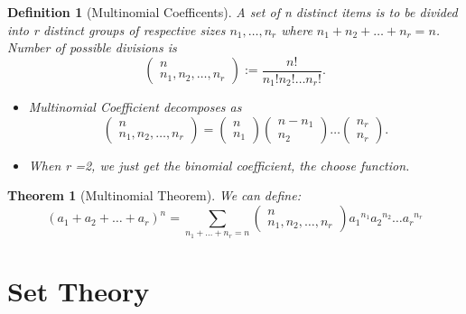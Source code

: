 \documentclass[a4paper]{article}
\newcounter{counter}
\numberwithin{counter}{subsection}
\theoremstyle{break}
\newtheorem{definition}{Definition}
\newtheorem{theorem}[counter]{Theorem}
\begin{document}
			\begin{definition}[Multinomial Coefficents]
				A set of n distinct items is to be divided into r distinct groups of respective sizes $n_1,\ldots, n_r$	where $n_1 + n_2 + \ldots + n_r = n$.\\
				Number of possible divisions is \[
				\begin{pmatrix} n \\ n_1,n_2,\ldots, n_r \end{pmatrix} := \frac{n!}{n_1 ! n_2 ! \ldots n_r !} 
				.\] 

				\begin{itemize}
					\item Multinomial Coefficient decomposes as \[
							\begin{pmatrix} n \\ n_1, n_2, \ldots, n_r\end{pmatrix} = \begin{pmatrix} n \\ n_1\end{pmatrix} \begin{pmatrix} n - n_1 \\ n_2\end{pmatrix} \ldots \begin{pmatrix} n_r \\ n_r \end{pmatrix}
					.\] 

					\item When r =2, we just get the binomial coefficient, the choose function.
				\end{itemize}
			\end{definition}

			\begin{theorem}[Multinomial Theorem]
				We can define:
				$$(a_1 + a_2 + \ldots + a _r )^{n} = \sum_{n_1 + \ldots + n_r = n} \begin{pmatrix} n \\ n_1, n_2, \ldots, n_r \end{pmatrix} {a_1}^{n_1}{a_2}^{n_2}\ldots{a_r}^{n_r}$$
			\end{theorem}

		\section{Set Theory}%
		
\end{document}
